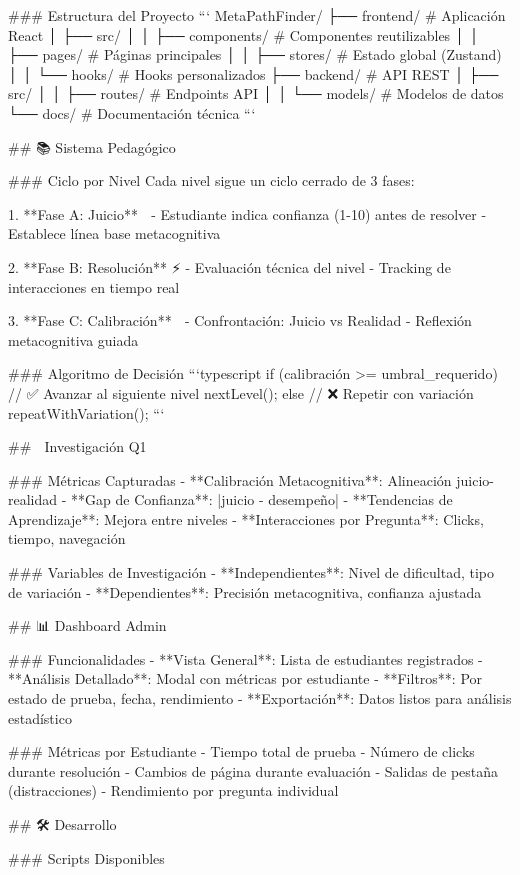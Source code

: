 ### Estructura del Proyecto
```
MetaPathFinder/
├── frontend/           # Aplicación React
│   ├── src/
│   │   ├── components/ # Componentes reutilizables
│   │   ├── pages/      # Páginas principales
│   │   ├── stores/     # Estado global (Zustand)
│   │   └── hooks/      # Hooks personalizados
├── backend/            # API REST
│   ├── src/
│   │   ├── routes/     # Endpoints API
│   │   └── models/     # Modelos de datos
└── docs/               # Documentación técnica
```

## 📚 Sistema Pedagógico

### Ciclo por Nivel
Cada nivel sigue un ciclo cerrado de 3 fases:

1. **Fase A: Juicio** 🧠
   - Estudiante indica confianza (1-10) antes de resolver
   - Establece línea base metacognitiva

2. **Fase B: Resolución** ⚡
   - Evaluación técnica del nivel
   - Tracking de interacciones en tiempo real

3. **Fase C: Calibración** 🎯
   - Confrontación: Juicio vs Realidad
   - Reflexión metacognitiva guiada

### Algoritmo de Decisión
```typescript
if (calibración >= umbral_requerido) {
  // ✅ Avanzar al siguiente nivel
  nextLevel();
} else {
  // ❌ Repetir con variación
  repeatWithVariation();
}
```

## 🔬 Investigación Q1

### Métricas Capturadas
- **Calibración Metacognitiva**: Alineación juicio-realidad
- **Gap de Confianza**: |juicio - desempeño|
- **Tendencias de Aprendizaje**: Mejora entre niveles
- **Interacciones por Pregunta**: Clicks, tiempo, navegación

### Variables de Investigación
- **Independientes**: Nivel de dificultad, tipo de variación
- **Dependientes**: Precisión metacognitiva, confianza ajustada

## 📊 Dashboard Admin

### Funcionalidades
- **Vista General**: Lista de estudiantes registrados
- **Análisis Detallado**: Modal con métricas por estudiante
- **Filtros**: Por estado de prueba, fecha, rendimiento
- **Exportación**: Datos listos para análisis estadístico

### Métricas por Estudiante
- Tiempo total de prueba
- Número de clicks durante resolución
- Cambios de página durante evaluación
- Salidas de pestaña (distracciones)
- Rendimiento por pregunta individual

## 🛠️ Desarrollo

### Scripts Disponibles

